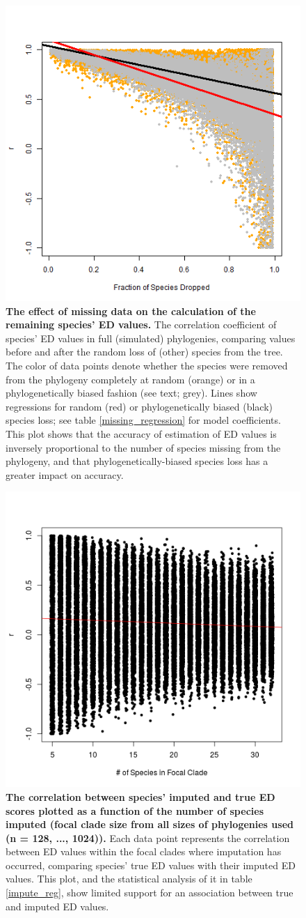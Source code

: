 \documentclass[10pt,english]{article}
\begin{document}
\begin{figure}[!ht]
  \center
  \includegraphics[width=.5\textwidth]{../figures/randomVsCluster.png}
  \caption{\textbf{The effect of missing data on the calculation of the
      remaining species' ED values.} The correlation coefficient of species' ED
      values in full (simulated) phylogenies, comparing values before and after
      the random loss of (other) species from the tree. The color of data points
      denote whether the species were removed from the phylogeny completely at
      random (orange) or in a phylogenetically biased fashion (see text; grey).
      Lines show regressions for random (red) or phylogenetically biased (black)
      species loss; see table \ref{missing_regression} for model coefficients.
      This plot shows that the accuracy of estimation of ED values is inversely
      proportional to the number of species missing from the phylogeny, and that
      phylogenetically-biased species loss has a greater impact on accuracy.}
  \label{randomVsClustered}
\end{figure}

\begin{figure}[!ht]
  \center
  \includegraphics[width=.5\textwidth]{../figures/edModel.png}
  \caption{\textbf{The correlation between species' imputed and true ED scores
      plotted as a function of the number of species imputed (focal clade size
      from all sizes of phylogenies used (n = 128, ..., 1024)).} Each data point
      represents the correlation between ED values within the focal clades where
      imputation has occurred, comparing species' true ED values with their
      imputed ED values. This plot, and the statistical analysis of it in table
      \ref{impute_reg}, show limited support for an association between true and
      imputed ED values.}
  \label{imputationTrend}
\end{figure}
\end{document}
